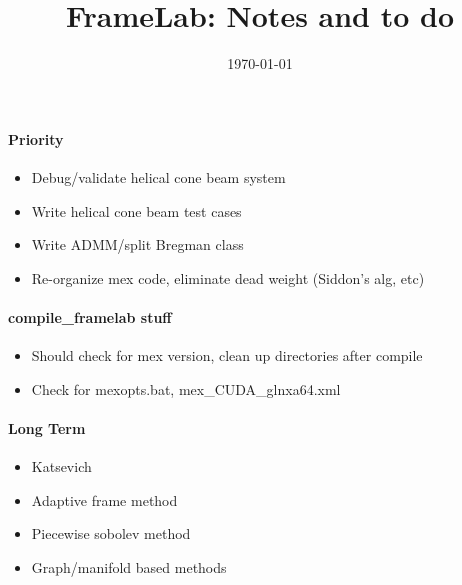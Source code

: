 \documentclass[12pt]{article}
\title{FrameLab: Notes and to do}
\date{\today}
\begin{document}
\maketitle


\paragraph{Priority}
\begin{itemize}
\item Debug/validate helical cone beam system 
\item Write helical cone beam test cases
\item Write ADMM/split Bregman class
\item Re-organize mex code, eliminate dead weight (Siddon's alg, etc)
\end{itemize}


\paragraph{compile\_framelab stuff}
\begin{itemize}
\item Should check for mex version, clean up directories after compile
\item Check for mexopts.bat, mex\_CUDA\_glnxa64.xml
\end{itemize}


\paragraph{Long Term}
\begin{itemize}
\item Katsevich
\item Adaptive frame method
\item Piecewise sobolev method 
\item Graph/manifold based methods 
\end{itemize}



\end{document}

